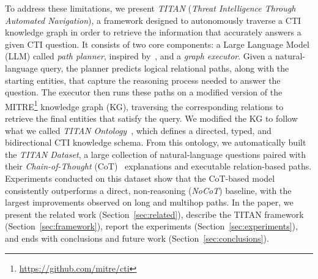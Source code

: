 \documentclass[11pt]{article}
\begin{document}
 
To address these limitations, we present \textit{TITAN} (\textit{Threat Intelligence Through Automated Navigation}), a framework designed to autonomously traverse a CTI knowledge graph in order to retrieve the information that accurately answers a given CTI question. 
 It consists of two core components: a Large Language Model (LLM) called \textit{path planner}, inspired by~\cite{rog}, and a \textit{graph executor}.  
Given a natural-language query, the planner predicts logical relational paths, along with the starting entities, that capture the reasoning process needed to answer the question.  
The executor then runs these paths on a modified version of the MITRE\footnote{\url{https://github.com/mitre/cti}} knowledge graph (KG), traversing the corresponding relations to retrieve the final entities that satisfy the query. We modified the KG to follow what we called \textit{TITAN Ontology}~\cite{liu2020stix}, which defines a directed, typed, and bidirectional CTI knowledge schema.  
From this ontology, we automatically built the \textit{TITAN Dataset}, a large collection of natural-language questions paired with their\textit{ Chain-of-Thought} (CoT)~\cite{wei2022chain} explanations and executable relation-based paths. Experiments conducted on this dataset show that the CoT-based model consistently outperforms a direct, non-reasoning (\textit{NoCoT}) baseline, with the largest improvements observed on long and multihop paths. In the paper, we present the related work (Section~\ref{sec:related}), describe the TITAN framework (Section~\ref{sec:framework}), report the experiments (Section~\ref{sec:experiments}), and ends with conclusions and future work (Section~\ref{sec:conclusions}).
\end{document}
